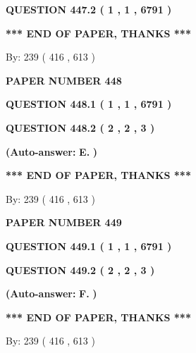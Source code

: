 \documentclass[12pt]{article}
\begin{document}
 
  
  
{\textbf{\large{QUESTION
447.2 
 ( 1 , 1 , 6791 )
}}}
   
   
   
   
\vspace{1.0in} 
{\textbf{\large{ *** END OF PAPER, THANKS *** }}} 
   
   
\hspace{1.0in} By: 
 239 ( 416 ,  613 )
   
   
   
   
\newpage 
\setcounter{page}{ 
   448001 } 
   
   
 {\textbf{ \Large{ PAPER NUMBER  448  }}}
   
   
   
   
  
  
{\textbf{\large{QUESTION
448.1 
 ( 1 , 1 , 6791 )
}}}
  
  
{\textbf{\large{QUESTION
448.2 
 ( 2 , 2 , 3 )
}}}
 
 
{\textbf{(Auto-answer:}}
{\textbf{\large{
E.}}}
{\textbf{)}}
 
 
   
   
   
   
\vspace{1.0in} 
{\textbf{\large{ *** END OF PAPER, THANKS *** }}} 
   
   
\hspace{1.0in} By: 
 239 ( 416 ,  613 )
   
   
   
   
\newpage 
\setcounter{page}{ 
   449001 } 
   
   
 {\textbf{ \Large{ PAPER NUMBER  449  }}}
   
   
   
   
  
  
{\textbf{\large{QUESTION
449.1 
 ( 1 , 1 , 6791 )
}}}
  
  
{\textbf{\large{QUESTION
449.2 
 ( 2 , 2 , 3 )
}}}
 
 
{\textbf{(Auto-answer:}}
{\textbf{\large{
F.}}}
{\textbf{)}}
 
 
   
   
   
   
\vspace{1.0in} 
{\textbf{\large{ *** END OF PAPER, THANKS *** }}} 
   
   
\hspace{1.0in} By: 
 239 ( 416 ,  613 )
   
   
   
   
\newpage 
\setcounter{page}{ 
   450001 } 
   
\end{document}
